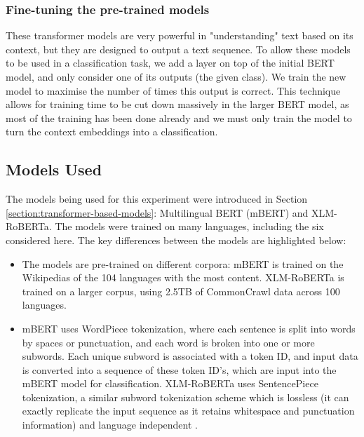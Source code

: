 \documentclass{l4proj}
\begin{document}
\subsubsection{Fine-tuning the pre-trained models}
These transformer models are very powerful in "understanding" text based on its context, but they are designed to output a text sequence. To allow these models to be used in a classification task, we add a layer on top of the initial BERT model, and only consider one of its outputs (the given class). We train the new model to maximise the number of times this output is correct. This technique allows for training time to be cut down massively in the larger BERT model, as most of the training has been done already and we must only train the model to turn the context embeddings into a classification.


\subsection{Models Used}
\par
The models being used for this experiment were introduced in Section \ref{section:transformer-based-models}: Multilingual BERT (mBERT) and XLM-RoBERTa. The models were trained on many languages, including the six considered here. The key differences between the models are highlighted below:
\begin{itemize}
    \item The models are pre-trained on different corpora: mBERT is trained on the Wikipedias of the 104 languages with the most content. XLM-RoBERTa is trained on a larger corpus, using 2.5TB of CommonCrawl data across 100 languages. 
    \item mBERT uses WordPiece tokenization, where each sentence is split into words by spaces or punctuation, and each word is broken into one or more subwords. Each unique subword is associated with a token ID, and input data is converted into a sequence of these token ID's, which are input into the mBERT model for classification. XLM-RoBERTa uses SentencePiece tokenization, a similar subword tokenization scheme which is lossless (it can exactly replicate the input sequence as it retains whitespace and punctuation information) and language independent \citep{kudo2018sentencepiece}. 
\end{itemize}
 
\end{document}

